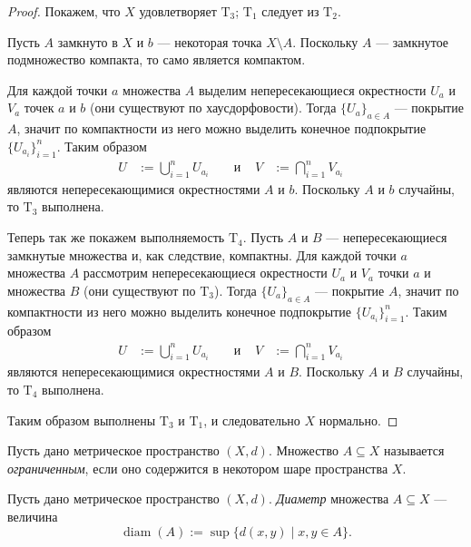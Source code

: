 \documentclass[12pt,a4paper]{article}
\DeclareMathOperator{\diam}{diam}
\newcommand{\T}{\ensuremath{\mathrm{T}}\xspace}
\begin{document}
    \begin{proof}
        Покажем, что $X$ удовлетворяет $\T_3$; $\T_1$ следует из $\T_2$.
        
        Пусть $A$ замкнуто в $X$ и $b$ --- некоторая точка $X \setminus A$. Поскольку $A$ --- замкнутое подмножество компакта, то само является компактом.

        Для каждой точки $a$ множества $A$ выделим непересекающиеся окрестности $U_a$ и $V_a$ точек $a$ и $b$ (они существуют по хаусдорфовости). Тогда $\{U_a\}_{a \in A}$ --- покрытие $A$, значит по компактности из него можно выделить конечное подпокрытие $\{U_{a_i}\}_{i=1}^n$. Таким образом
        \begin{align*}
            U &:= \bigcup_{i=1}^n U_{a_i}&
            &\text{ и }&
            V &:= \bigcap_{i=1}^n V_{a_i}&
        \end{align*}
        являются непересекающимися окрестностями $A$ и $b$. Поскольку $A$ и $b$ случайны, то $\T_3$ выполнена.

        Теперь так же покажем выполняемость $\T_4$. Пусть $A$ и $B$ --- непересекающиеся замкнутые множества и, как следствие, компактны. Для каждой точки $a$ множества $A$ рассмотрим непересекающиеся окрестности $U_a$ и $V_a$ точки $a$ и множества $B$ (они существуют по $\T_3$). Тогда $\{U_a\}_{a \in A}$ --- покрытие $A$, значит по компактности из него можно выделить конечное подпокрытие $\{U_{a_i}\}_{i=1}^n$. Таким образом
        \begin{align*}
            U &:= \bigcup_{i=1}^n U_{a_i}&
            &\text{ и }&
            V &:= \bigcap_{i=1}^n V_{a_i}&
        \end{align*}
        являются непересекающимися окрестностями $A$ и $B$. Поскольку $A$ и $B$ случайны, то $\T_4$ выполнена.

        Таким образом выполнены $\T_3$ и $\T_1$, и следовательно $X$ нормально.
    \end{proof}

    \begin{definition}
        Пусть дано метрическое пространство $(X, d)$. Множество $A \subseteq X$ называется \emph{ограниченным}, если оно содержится в некотором шаре пространства $X$.
    \end{definition}

    \begin{definition}
        Пусть дано метрическое пространство $(X, d)$. \emph{Диаметр} множества $A \subseteq X$ --- величина
        \[\diam(A) := \sup \{d(x,y) \mid x, y \in A\}.\]
    \end{definition}
\end{document}
